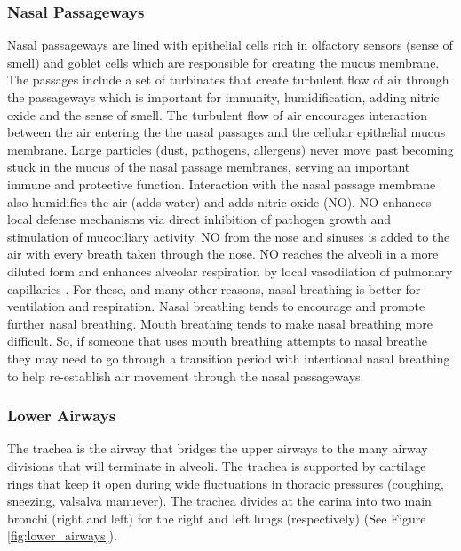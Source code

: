 \subsubsection{Nasal Passageways} 
Nasal passageways are lined with epithelial cells rich in olfactory sensors (sense of smell) and goblet cells which are responsible for creating the mucus membrane. The passages include a set of turbinates that create turbulent flow of air through the passageways which is important for immunity, humidification, adding nitric oxide and the sense of smell. The turbulent flow of air encourages interaction between the air entering the the nasal passages and the cellular epithelial mucus membrane. Large particles (dust, pathogens, allergens) never move past becoming stuck in the mucus of the nasal passage membranes, serving an important immune and protective function. Interaction with the nasal passage membrane also humidifies the air (adds water) and adds nitric oxide (NO). NO enhances local defense mechanisms via direct inhibition of pathogen growth and stimulation of mucociliary activity. NO from the nose and sinuses is added to the air with every breath taken through the nose. NO reaches the alveoli in a more diluted form and enhances alveolar respiration by local vasodilation of pulmonary capillaries \cite{tornberg_nasal_2002, lundberg_nitric_2008}. For these, and many other reasons, nasal breathing is better for ventilation and respiration. Nasal breathing tends to encourage and promote further nasal breathing. Mouth breathing tends to make nasal breathing more difficult. So, if someone that uses mouth breathing attempts to nasal breathe they may need to go through a transition period with intentional nasal breathing to help re-establish air movement through the nasal passageways.

\subsubsection{Lower Airways}
The trachea is the airway that bridges the upper airways to the many airway divisions that will terminate in alveoli. The trachea is supported by cartilage rings that keep it open during wide fluctuations in thoracic pressures (coughing, sneezing, valsalva manuever\footnotemark{}). The trachea divides at the carina into two main bronchi (right and left) for the right and left lungs (respectively) (See Figure \ref{fig:lower_airways}). 

